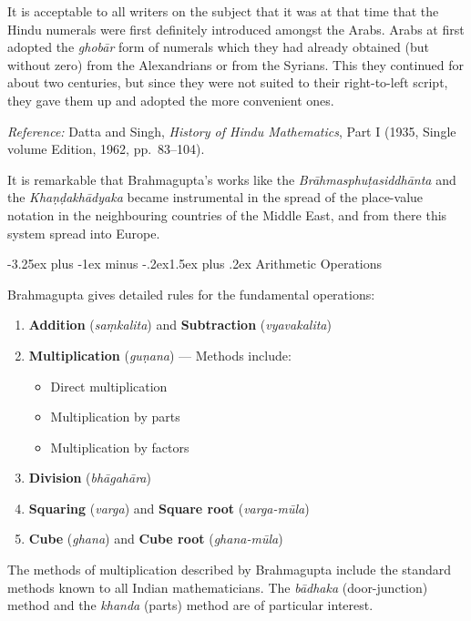 \documentclass[11pt,a4paper]{article}
\makeatletter
\renewcommand{\subsection}{\@startsection{subsection}{2}{\z@}%
  {-3.25ex plus -1ex minus -.2ex}{1.5ex plus .2ex}%
  {\normalfont\large\bfseries\color{sectioncolor}}}
\newcommand{\cnote}[1]{\textcolor{notecolor}{\textit{#1}}}
\makeatother
\begin{document}
It is acceptable to all writers on the subject that it was at that time that the Hindu numerals were first definitely introduced amongst the Arabs. Arabs at first adopted the \textit{ghobār} form of numerals which they had already obtained (but without zero) from the Alexandrians or from the Syrians. This they continued for about two centuries, but since they were not suited to their right-to-left script, they gave them up and adopted the more convenient ones.

\cnote{Reference:} Datta and Singh, \textit{History of Hindu Mathematics}, Part I (1935, Single volume Edition, 1962, pp.\ 83--104).

It is remarkable that Brahmagupta's works like the \textit{Brāhmasphuṭasiddhānta} and the \textit{Khaṇḍakhādyaka} became instrumental in the spread of the place-value notation in the neighbouring countries of the Middle East, and from there this system spread into Europe.

\subsection{Arithmetic Operations}

Brahmagupta gives detailed rules for the fundamental operations:

\begin{enumerate}[label=\arabic*.]
\item \textbf{Addition} (\textit{saṃkalita}) and \textbf{Subtraction} (\textit{vyavakalita})
\item \textbf{Multiplication} (\textit{guṇana}) --- Methods include:
  \begin{itemize}
  \item Direct multiplication
  \item Multiplication by parts
  \item Multiplication by factors
  \end{itemize}
\item \textbf{Division} (\textit{bhāgahāra})
\item \textbf{Squaring} (\textit{varga}) and \textbf{Square root} (\textit{varga-mūla})
\item \textbf{Cube} (\textit{ghana}) and \textbf{Cube root} (\textit{ghana-mūla})
\end{enumerate}

The methods of multiplication described by Brahmagupta include the standard methods known to all Indian mathematicians. The \textit{bādhaka} (door-junction) method and the \textit{khanda} (parts) method are of particular interest.
\end{document}
